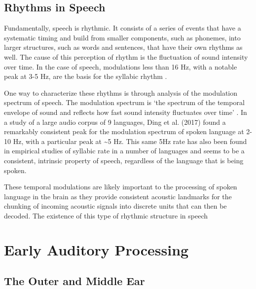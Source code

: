 \documentclass[titlepage]{article}
\begin{document}
  \subsection{Rhythms in Speech} \label{rhythmsInSpeech}

    Fundamentally, speech is rhythmic. It consists of a series of events that have a
    systematic timing and build from smaller components, such as phonemes, into larger
    structures, such as words and sentences, that have their own rhythms as well. The
    cause of this perception of rhythm is the fluctuation of sound intensity over time.
    In the case of speech, modulations less than 16 Hz, with a notable peak at 3-5 Hz,
    are the basis for the syllabic rhythm \cite{Giraud2012,Greenberg2003}.

    One way to characterize these rhythms is through analysis of the modulation spectrum of
    speech. The modulation spectrum is `the spectrum of the temporal envelope of sound and
    reflects how fast sound intensity fluctuates over time' \cite{Ding2017}. In a study of
    a large audio corpus of 9 languages, Ding et al. (2017) \cite{Ding2017} found a remarkably
    consistent peak for the modulation spectrum of spoken language at 2-10 Hz, with a particular
    peak at \textasciitilde 5 Hz. This same 5Hz rate has also been found in empirical studies of syllabic
    rate in a number of languages \cite{Pellegrino2011} and seems to be a consistent, intrinsic
    property of speech, regardless of the language that is being spoken.

    These temporal modulations are likely important to the processing of spoken language in the
    brain as they provide consistent acoustic landmarks for the chunking of incoming acoustic
    signals into discrete units that can then be decoded. The existence of this type of rhythmic
    structure in speech

\section{Early Auditory Processing} \label{early}

  \subsection{The Outer and Middle Ear}
\end{document}
